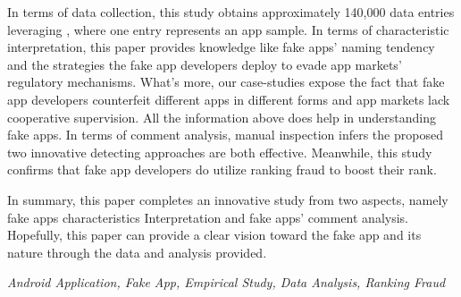 In terms of data collection, this study obtains approximately 140,000 data entries leveraging \mytool, where one entry represents an app sample.
In terms of characteristic interpretation, this paper provides knowledge like fake apps' naming tendency and the strategies the fake app developers deploy to evade app markets' regulatory mechanisms.
What's more, our case-studies expose the fact that fake app developers counterfeit different apps in different forms and app markets lack cooperative supervision.
All the information above does help in understanding fake apps.
In terms of comment analysis, manual inspection infers the proposed two innovative detecting approaches are both effective.
Meanwhile, this study confirms that fake app developers do utilize ranking fraud to boost their rank.

In summary, this paper completes an innovative study from two aspects, namely fake apps characteristics Interpretation and fake apps' comment analysis.
Hopefully, this paper can provide a clear vision toward the fake app and its nature through the data and analysis provided.

{} \textit{Android Application, Fake App, Empirical Study, Data Analysis, Ranking Fraud}
